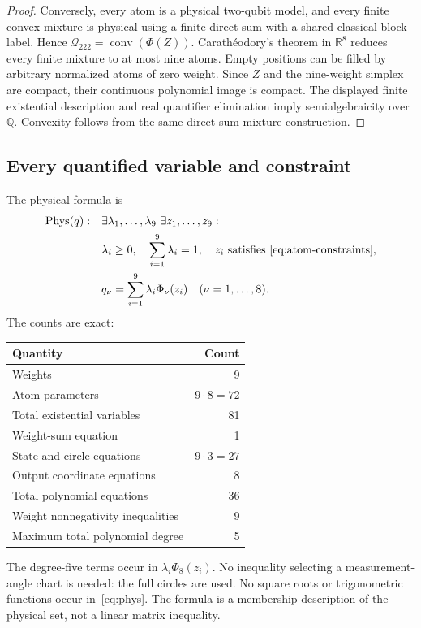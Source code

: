 \documentclass[11pt]{article}
\newcommand{\Q}{{\mathcal Q_{222}}}
\newcommand{\R}{\mathbb R}
\newcommand{\Phys}{\operatorname{Phys}}
\begin{document}
\begin{proof}
Conversely, every atom is a physical two-qubit model, and every finite convex mixture is physical using a finite direct sum with a shared classical block label. Hence $\Q=\operatorname{conv}(\Phi(Z))$. Carath\'eodory's theorem in $\R^8$ reduces every finite mixture to at most nine atoms. Empty positions can be filled by arbitrary normalized atoms of zero weight. Since $Z$ and the nine-weight simplex are compact, their continuous polynomial image is compact. The displayed finite existential description and real quantifier elimination imply semialgebraicity over $\mathbb Q$. Convexity follows from the same direct-sum mixture construction.
\end{proof}

\subsection{Every quantified variable and constraint}
The physical formula is
\begin{equation}\label{eq:phys}
 \begin{aligned}
 \Phys(q):\quad&\exists\lambda_1,\ldots,\lambda_9\ 
                  \exists z_1,\ldots,z_9:\\
 &\lambda_i\ge0,\quad\sum_{i=1}^{9}\lambda_i=1,\quad
                  z_i\text{ satisfies~\eqref{eq:atom-constraints}},\\
 &q_\nu=\sum_{i=1}^{9}\lambda_i\Phi_\nu(z_i)
       \quad(\nu=1,\ldots,8).
 \end{aligned}
\end{equation}
The counts are exact:
\begin{center}
\begin{tabular}{lr}
\toprule
Quantity&Count\\\midrule
Weights&9\\
Atom parameters&$9\cdot8=72$\\
Total existential variables&81\\
Weight-sum equation&1\\
State and circle equations&$9\cdot3=27$\\
Output coordinate equations&8\\
Total polynomial equations&36\\
Weight nonnegativity inequalities&9\\
Maximum total polynomial degree&5\\\bottomrule
\end{tabular}
\end{center}
The degree-five terms occur in $\lambda_i\Phi_8(z_i)$. No inequality selecting a measurement-angle chart is needed: the full circles are used. No square roots or trigonometric functions occur in~\eqref{eq:phys}. The formula is a membership description of the physical set, not a linear matrix inequality.
\end{document}
